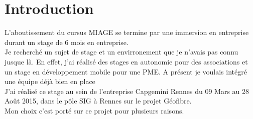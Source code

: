 \chapter*{Introduction}
L'aboutissement du cursus MIAGE se termine par une immersion en entreprise durant un stage de 6 mois en entreprise.
\\Je recherché un sujet de stage et un envirronement que je n'avais pas connu jusque là. En effet, j'ai réalisé des stages en autonomie pour des associations
et un stage en développement mobile pour une PME. A présent je voulais intégré une équipe déjà bien en place 
\\J'ai réalisé ce stage au sein de l'entreprise Capgemini Rennes du 09 Mars au 28 Août 2015, dans le pôle SIG à Rennes sur le projet Géofibre.
\\Mon choix c'est porté sur ce projet pour plusieurs raisons.
